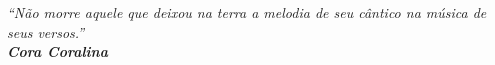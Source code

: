 \begin{epigrafe}
    \vspace*{\fill}
	\begin{flushright}
		\textit{``Não morre aquele que deixou na terra a melodia de seu cântico na música de seus versos.'' \\ 
		\textbf{Cora Coralina}  }
	\end{flushright}
\end{epigrafe}
